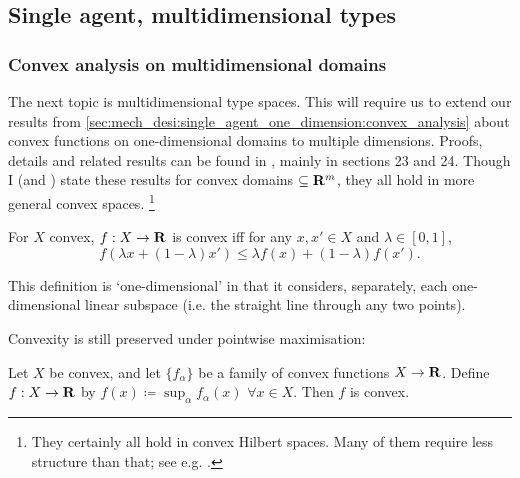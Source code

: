 \documentclass[11pt,letterpaper,reqno,oneside]{article}
\begin{document}
\pagebreak
\subsection{Single agent, multidimensional types}
\label{sec:mech_desi:single_agent_multiple_dimensions}


\subsubsection{Convex analysis on multidimensional domains}
\label{sec:mech_desi:single_agent_multiple_dimensions:convex_analysis_multi}

The next topic is multidimensional type spaces. This will require us to extend our results from \cref{sec:mech_desi:single_agent_one_dimension:convex_analysis} about convex functions on one-dimensional domains to multiple dimensions. Proofs, details and related results can be found in \textcite{Rockafellar1970}, mainly in sections 23 and 24. Though I (and \textcite{Rockafellar1970}) state these results for convex domains $\subseteq \mathbf{R}^m$, they all hold in more general convex spaces.%
	\footnote{They certainly all hold in convex Hilbert spaces. Many of them require less structure than that; see e.g. \textcite{Rockafellar1966}.}

\begin{definition}
	For $X$ convex, $f : X \to \mathbf{R}$ is convex iff for any $x,x' \in X$ and $\lambda \in [0,1]$,
	\begin{equation*}
		f( \lambda x + (1-\lambda) x' ) \leq \lambda f(x) + (1-\lambda) f(x') .
	\end{equation*}
\end{definition}
%
\noindent This definition is `one-dimensional' in that it considers, separately, each one-dimensional linear subspace (i.e. the straight line through any two points).

Convexity is still preserved under pointwise maximisation:
%
\begin{proposition}
	Let $X$ be convex, and let $\{ f_\alpha \}$ be a family of convex functions $X \to \mathbf{R}$. Define $f : X \to \mathbf{R}$ by $f(x) \coloneqq \sup_\alpha f_\alpha(x)$ $\forall x \in X$. Then $f$ is convex.
\end{proposition}
%
\end{document}
